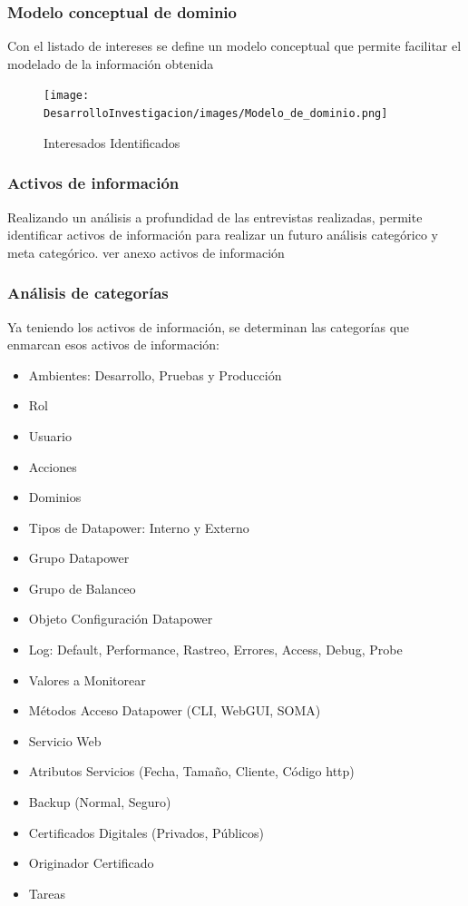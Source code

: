 \subsubsection{Modelo conceptual de dominio}
Con el listado de intereses se define un modelo conceptual que permite facilitar el modelado de la información obtenida
\begin{figure}[th!]
    \centering
    \texttt{[image: DesarrolloInvestigacion/images/Modelo\_de\_dominio.png]}
    \caption{Interesados Identificados}
\end{figure}
\subsubsection{Activos de información}
Realizando un análisis a profundidad de las entrevistas realizadas, permite identificar activos de información para realizar un futuro análisis categórico y meta categórico.
\newline ver anexo activos de información
\subsubsection{Análisis de categorías}
Ya teniendo los activos de información, se determinan las categorías que enmarcan esos activos de información:
\begin{itemize}
    \item Ambientes: Desarrollo, Pruebas y Producción
    \item Rol
    \item Usuario
    \item Acciones
    \item Dominios
    \item Tipos de Datapower: Interno y Externo
    \item Grupo Datapower
    \item Grupo de Balanceo
    \item Objeto Configuración Datapower
    \item Log: Default, Performance, Rastreo, Errores, Access, Debug, Probe
    \item Valores a Monitorear
    \item Métodos Acceso Datapower (CLI, WebGUI, SOMA)
    \item Servicio Web
    \item Atributos Servicios (Fecha, Tamaño, Cliente, Código http)
    \item Backup (Normal, Seguro)
    \item Certificados Digitales (Privados, Públicos)
    \item Originador Certificado
    \item Tareas
\end{itemize}
